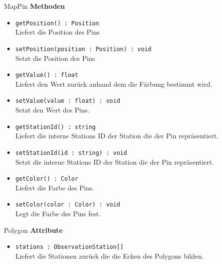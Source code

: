     \begin{Class}{MapPin}
        \textbf{Methoden}
        \begin{itemize}
            \item \texttt{getPosition() : Position}
            \\ Liefert die Position des Pins
            \item \texttt{setPosition(position : Position) : void}
            \\ Setzt die Position des Pins

            \bigskip
            \item \texttt{getValue() : float}
            \\ Liefert den Wert zurück anhand dem die Färbung bestimmt wird.
            \item \texttt{setValue(value : float) : void}
            \\ Setzt den Wert des Pins.

            \bigskip
            \item \texttt{getStationId() : string}
            \\ Liefert die interne Stations ID der Station die der Pin repräsentiert.
            \item \texttt{setStationId(id : string) : void}
            \\ Setzt die interne Stations ID der Station die der Pin repräsentiert.

            \bigskip
            \item \texttt{getColor() : Color}
            \\ Liefert die Farbe des Pins.
            \item \texttt{setColor(color : Color) : void}
            \\ Legt die Farbe des Pins fest.
        \end{itemize}
    \end{Class}

    \begin{Class}{Polygon}
        \textbf{Attribute}
        \begin{itemize}
            \item \texttt{stations : ObservationStation[]}
            \\ Liefert die Stationen zurück die die Ecken des Polygons bilden.
        \end{itemize}
    \end{Class}

